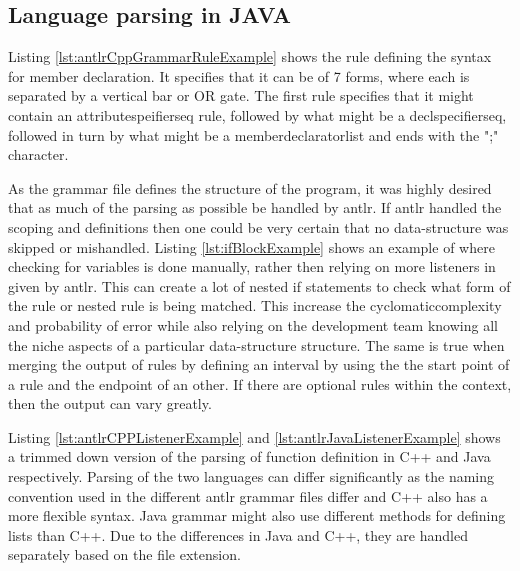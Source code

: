 \subsection{Language parsing in JAVA}


Listing \ref{lst:antlrCppGrammarRuleExample} shows the rule defining the syntax for member declaration. 
It specifies that it can be of 7 forms, where each is separated by a vertical bar or OR gate. The first rule specifies that it might contain an attributespeifierseq rule, followed by what might be a declspecifierseq, followed in turn by what might be a memberdeclaratorlist and ends with the ";" character. 


As the grammar file defines the structure of the program, it was highly desired that as much of the parsing as possible be handled by \gls{antlr}. If \gls{antlr} handled the scoping and definitions then one could be very certain that no data-structure was skipped or mishandled. Listing \ref{lst:ifBlockExample} shows an example of where checking for variables is done manually, rather then relying on more listeners in given by \gls{antlr}. This can create a lot of nested if statements to check what form of the rule or nested rule is being matched. This increase the \Gls{cyclomaticcomplexity} and probability of error while also relying on the development team knowing all the niche aspects of a particular data-structure structure. The same is true when merging the output of rules by defining an interval by using the the start point of a rule and the endpoint of an other. If there are optional rules within the context, then the output can vary greatly. 





Listing \ref{lst:antlrCPPListenerExample} and \ref{lst:antlrJavaListenerExample} shows a trimmed down version of the parsing of function definition in C++ and Java respectively. Parsing of the two languages can differ significantly as the naming convention used in the different \gls{antlr} grammar files differ and C++ also has a more flexible syntax. Java grammar might also use different methods for defining lists than C++. 
Due to the differences in Java and C++, they are handled separately based on the file extension. 

